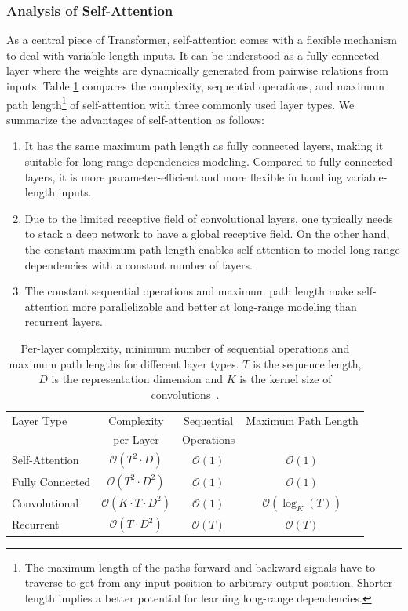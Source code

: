 \documentclass[manuscript,acmsmall,screen,nonacm]{acmart}
\theoremstyle{definition}
\begin{document}
\subsubsection{Analysis of Self-Attention}
As a central piece of Transformer, self-attention comes with a flexible mechanism to deal with variable-length inputs. It can be understood as a fully connected layer where the weights are dynamically generated from pairwise relations from inputs. Table \ref{tab:op_complexities} compares the complexity, sequential operations, and maximum path length\footnote{The maximum length of the paths forward and backward signals have to traverse to get from any input position to arbitrary output position. Shorter length implies a better potential for learning long-range dependencies.} of self-attention with three commonly used layer types. We summarize the advantages of self-attention as follows:
\begin{enumerate}
    \item It has the same maximum path length as fully connected layers, making it suitable for long-range dependencies modeling. Compared to fully connected layers, it is more parameter-efficient and more flexible in handling variable-length inputs.
    \item Due to the limited receptive field of convolutional layers, one typically needs to stack a deep network to have a global receptive field. On the other hand, the constant maximum path length enables self-attention to model long-range dependencies with a constant number of layers.
    \item The constant sequential operations and maximum path length make self-attention more parallelizable and better at long-range modeling than recurrent layers.
\end{enumerate}

\begin{table}[ht]
    \caption{Per-layer complexity, minimum number of sequential operations and maximum path lengths for different layer types. $T$ is the sequence length, $D$ is the representation dimension and $K$ is the kernel size of convolutions~\cite{vaswani2017attention}.}
\label{tab:op_complexities}
\begin{center}
\vspace{-1mm}
\begin{tabular}{lccc}
\toprule
Layer Type & Complexity & Sequential & Maximum Path Length  \\
           &per Layer         & Operations &   \\
\hline
\rule{0pt}{2.0ex}Self-Attention & $\mathcal O(T^2 \cdot D)$ & $\mathcal O(1)$ & $\mathcal O(1)$ \\
Fully Connected & $\mathcal O(T^2 \cdot D^2)$ & $\mathcal O(1)$ & $\mathcal O(1)$ \\
Convolutional & $\mathcal O(K \cdot T \cdot D^2)$ & $\mathcal O(1)$ & $\mathcal O(\log_K(T))$ \\
Recurrent & $\mathcal O(T \cdot D^2)$ & $\mathcal O(T)$ & $\mathcal O(T)$ \\
\bottomrule
\end{tabular}
\end{center}
\end{table}
\end{document}

